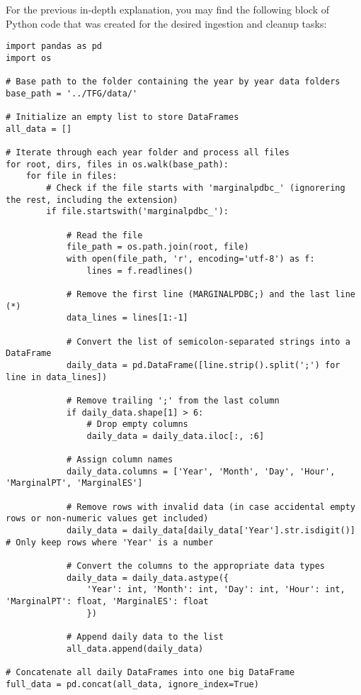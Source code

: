 \documentclass[12pt]{report} %
\begin{document}
For the previous in-depth explanation, you may find the following block of Python code that was created for the desired ingestion and cleanup tasks:
\begin{lstlisting}
import pandas as pd
import os

# Base path to the folder containing the year by year data folders
base_path = '../TFG/data/'

# Initialize an empty list to store DataFrames
all_data = []

# Iterate through each year folder and process all files
for root, dirs, files in os.walk(base_path):
    for file in files:
        # Check if the file starts with 'marginalpdbc_' (ignorering the rest, including the extension)
        if file.startswith('marginalpdbc_'):
            
            # Read the file
            file_path = os.path.join(root, file)
            with open(file_path, 'r', encoding='utf-8') as f:
                lines = f.readlines()

            # Remove the first line (MARGINALPDBC;) and the last line (*)
            data_lines = lines[1:-1]
            
            # Convert the list of semicolon-separated strings into a DataFrame
            daily_data = pd.DataFrame([line.strip().split(';') for line in data_lines])
            
            # Remove trailing ';' from the last column
            if daily_data.shape[1] > 6:
                # Drop empty columns
                daily_data = daily_data.iloc[:, :6]
            
            # Assign column names
            daily_data.columns = ['Year', 'Month', 'Day', 'Hour', 'MarginalPT', 'MarginalES']
            
            # Remove rows with invalid data (in case accidental empty rows or non-numeric values get included)
            daily_data = daily_data[daily_data['Year'].str.isdigit()]  # Only keep rows where 'Year' is a number
            
            # Convert the columns to the appropriate data types
            daily_data = daily_data.astype({
                'Year': int, 'Month': int, 'Day': int, 'Hour': int, 'MarginalPT': float, 'MarginalES': float
                })
            
            # Append daily data to the list
            all_data.append(daily_data)

# Concatenate all daily DataFrames into one big DataFrame
full_data = pd.concat(all_data, ignore_index=True)


\end{lstlisting}
\end{document}

